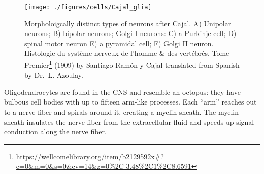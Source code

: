 \documentclass[]{book}
\let\rmarkdownfootnote\footnote%
\def\footnote{\protect\rmarkdownfootnote}
\renewcommand{\href}[2]{#2\footnote{\url{#1}}}
\begin{document}
\begin{figure}

{\centering \texttt{[image: ./figures/cells/Cajal\_glia]} 

}

\caption{Morpholoigcally distinct types of neurons after Cajal. A) Unipolar neurons; B) bipolar neurons; Golgi I neurons: C) a Purkinje cell; D) spinal motor neuron E) a pyramidal cell; F) Golgi II neuron. \href{https://wellcomelibrary.org/item/b2129592x\#?c=0\&m=0\&s=0\&cv=14\&z=0\%2C-3.48\%2C1\%2C8.6591}{Histologie du système nerveux de l'homme \& des vertébrés, Tome Premier} (1909) by Santiago Ramón y Cajal translated from Spanish by Dr.~L. Azoulay.}\label{fig:astrocytes}
\end{figure}

Oligodendrocytes are found in the CNS and resemble an octopus: they have bulbous cell bodies with up to fifteen arm-like processes. Each ``arm'' reaches out to a nerve fiber and spirals around it, creating a myelin sheath. The myelin sheath insulates the nerve fiber from the extracellular fluid and speeds up signal conduction along the nerve fiber.
\end{document}
